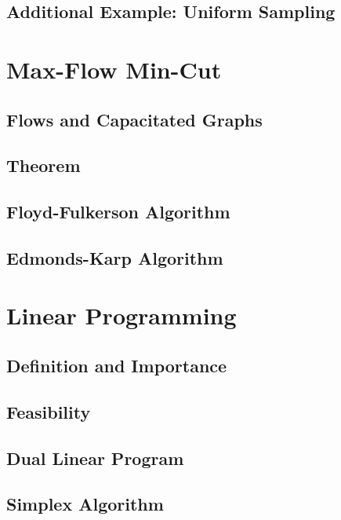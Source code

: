 \documentclass[10pt]{article}
\theoremstyle{plain}
\theoremstyle{definition}
\numberwithin{equation}{section}
\numberwithin{figure}{section}
\begin{document}
\subsection{Additional Example: Uniform Sampling}

\newpage
\section{Max-Flow Min-Cut}

\subsection{Flows and Capacitated Graphs}

\subsection{Theorem}

\subsection{Floyd-Fulkerson Algorithm}

\subsection{Edmonds-Karp Algorithm}

\newpage
\section{Linear Programming}

\subsection{Definition and Importance}

\subsection{Feasibility}

\subsection{Dual Linear Program}

\subsection{Simplex Algorithm}
\end{document}

